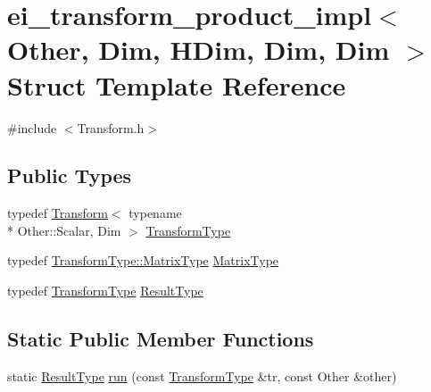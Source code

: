 \hypertarget{structei__transform__product__impl_3_01_other_00_01_dim_00_01_h_dim_00_01_dim_00_01_dim_01_4}{\section{ei\-\_\-transform\-\_\-product\-\_\-impl$<$ Other, Dim, H\-Dim, Dim, Dim $>$ Struct Template Reference}
\label{structei__transform__product__impl_3_01_other_00_01_dim_00_01_h_dim_00_01_dim_00_01_dim_01_4}
}


{\ttfamily \#include $<$Transform.\-h$>$}

\subsection*{Public Types}
\begin{DoxyCompactItemize}
\item 
typedef \hyperlink{class_transform}{Transform}$<$ typename \\*
Other\-::\-Scalar, Dim $>$ \hyperlink{structei__transform__product__impl_3_01_other_00_01_dim_00_01_h_dim_00_01_dim_00_01_dim_01_4_aee2773553ba245f7b20bb1f66c8149f3}{Transform\-Type}
\item 
typedef \hyperlink{class_transform_afcdb9f1ab6b63ddfbc52789ef6319f33}{Transform\-Type\-::\-Matrix\-Type} \hyperlink{structei__transform__product__impl_3_01_other_00_01_dim_00_01_h_dim_00_01_dim_00_01_dim_01_4_a32bbc1ea8303f648d3bed3639d649522}{Matrix\-Type}
\item 
typedef \hyperlink{structei__transform__product__impl_3_01_other_00_01_dim_00_01_h_dim_00_01_dim_00_01_dim_01_4_aee2773553ba245f7b20bb1f66c8149f3}{Transform\-Type} \hyperlink{structei__transform__product__impl_3_01_other_00_01_dim_00_01_h_dim_00_01_dim_00_01_dim_01_4_a047d3a0959545e8b2849ea2d5d806578}{Result\-Type}
\end{DoxyCompactItemize}
\subsection*{Static Public Member Functions}
\begin{DoxyCompactItemize}
\item 
static \hyperlink{structei__transform__product__impl_3_01_other_00_01_dim_00_01_h_dim_00_01_dim_00_01_dim_01_4_a047d3a0959545e8b2849ea2d5d806578}{Result\-Type} \hyperlink{structei__transform__product__impl_3_01_other_00_01_dim_00_01_h_dim_00_01_dim_00_01_dim_01_4_a3f450575783c0fbc1a4a77054deeff56}{run} (const \hyperlink{structei__transform__product__impl_3_01_other_00_01_dim_00_01_h_dim_00_01_dim_00_01_dim_01_4_aee2773553ba245f7b20bb1f66c8149f3}{Transform\-Type} \&tr, const Other \&other)
\end{DoxyCompactItemize}


